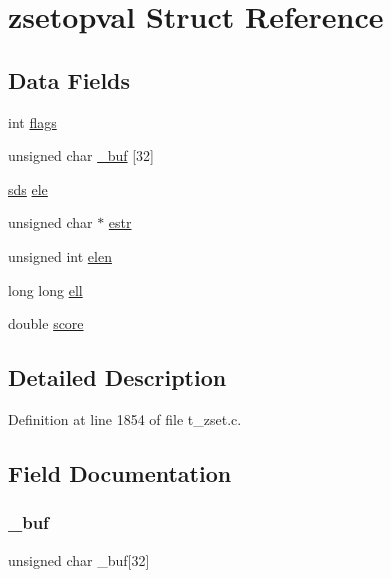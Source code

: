 \hypertarget{structzsetopval}{}\section{zsetopval Struct Reference}
\label{structzsetopval}
\subsection*{Data Fields}
\begin{DoxyCompactItemize}
\item 
int \hyperlink{structzsetopval_ac8bf36fe0577cba66bccda3a6f7e80a4}{flags}
\item 
unsigned char \hyperlink{structzsetopval_a6585b9bb92390edf62eecfc8270d0591}{\+\_\+buf} \mbox{[}32\mbox{]}
\item 
\hyperlink{sds_8h_ad69abac3df4532879db9642c95f5ef6f}{sds} \hyperlink{structzsetopval_ac99cd495189c228ff8d538f04489805e}{ele}
\item 
unsigned char $\ast$ \hyperlink{structzsetopval_af919050b68e6784d3a0282866cf2e816}{estr}
\item 
unsigned int \hyperlink{structzsetopval_a907e5fb6c87dd8624009bcc9f7f6cab6}{elen}
\item 
long long \hyperlink{structzsetopval_a80c5ae72fc44010a9f9adf075bb3e463}{ell}
\item 
double \hyperlink{structzsetopval_a40a24ec85daa9ac70aa74e4ca744f838}{score}
\end{DoxyCompactItemize}


\subsection{Detailed Description}


Definition at line 1854 of file t\+\_\+zset.\+c.



\subsection{Field Documentation}
\mbox{\label{structzsetopval_a6585b9bb92390edf62eecfc8270d0591}} 
\subsubsection{\texorpdfstring{\+\_\+buf}{\_buf}}
{\footnotesize\ttfamily unsigned char \+\_\+buf\mbox{[}32\mbox{]}}



